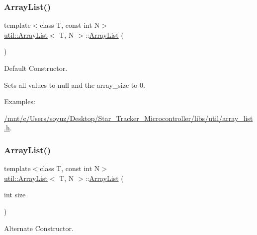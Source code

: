 \subsubsection{\texorpdfstring{Array\+List()}{ArrayList()}\hspace{0.1cm}{\footnotesize\ttfamily [1/3]}}
{\footnotesize\ttfamily template$<$class T, const int N$>$ \\
\hyperlink{classutil_1_1ArrayList}{util\+::\+Array\+List}$<$ T, N $>$\+::\hyperlink{classutil_1_1ArrayList}{Array\+List} (\begin{DoxyParamCaption}{ }\end{DoxyParamCaption})\hspace{0.3cm}{\ttfamily [inline]}}



Default Constructor. 

Sets all values to null and the array\+\_\+size to 0. \begin{Desc}
\item[Examples\+: ]\par
\hyperlink{_2mnt_2c_2Users_2soyuz_2Desktop_2Star_Tracker_Microcontroller_2libs_2util_2array_list_8h-example}{/mnt/c/\+Users/soyuz/\+Desktop/\+Star\+\_\+\+Tracker\+\_\+\+Microcontroller/libs/util/array\+\_\+list.\+h}.\end{Desc}
\mbox{\label{classutil_1_1ArrayList_aafcc495cef650c37932106bd19d82af6}} 
\subsubsection{\texorpdfstring{Array\+List()}{ArrayList()}\hspace{0.1cm}{\footnotesize\ttfamily [2/3]}}
{\footnotesize\ttfamily template$<$class T, const int N$>$ \\
\hyperlink{classutil_1_1ArrayList}{util\+::\+Array\+List}$<$ T, N $>$\+::\hyperlink{classutil_1_1ArrayList}{Array\+List} (\begin{DoxyParamCaption}\item[{int}]{size }\end{DoxyParamCaption})\hspace{0.3cm}{\ttfamily [inline]}}



Alternate Constructor. 



